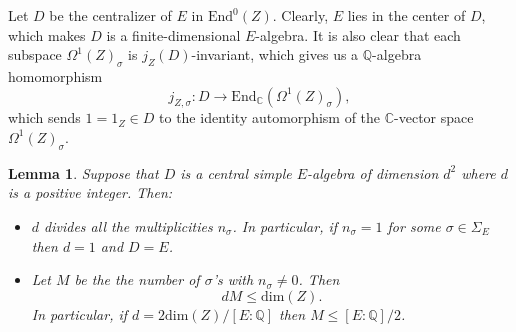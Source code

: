 \documentclass[12pt,a4paper,reqno]{amsart}
\def\Q{{\mathbb Q}}
\def\C{{\mathbb C}}
\def\End{\mathrm{End}}
\def\dim{\mathrm{dim}}
\newtheorem{lem}[thm]{Lemma}
\theoremstyle{definition}
\begin{document}
Let $D$ be the centralizer of $E$ in $\End^0(Z)$.  Clearly, $E$ lies in the center of $D$, which makes $D$ is a finite-dimensional $E$-algebra.
It is also clear that each subspace  $\Omega^1(Z)_{\sigma}$ is $j_Z(D)$-invariant, which gives us a $\Q$-algebra homomorphism
\begin{equation}
\label{difSigma}
j_{Z,\sigma}:D\to \End_{\C}(\Omega^1(Z)_{\sigma}),
\end{equation}
which sends $1=1_Z\in D$ to the identity automorphism of the $\C$-vector space 
$\Omega^1(Z)_{\sigma}$.

 

\begin{lem}
\label{divOmega1}
Suppose that $D$ is a central simple $E$-algebra of dimension $d^2$ where $d$ is a positive integer. Then: 

\begin{itemize}
\item[(i)]
$d$ divides
all the multiplicities $n_{\sigma}$.
In particular, if $n_{\sigma}=1$ for some $\sigma \in \Sigma_E$ then $d=1$ and $D=E$.
\item[(ii)]
Let $M$ be the the number of $\sigma$'s with $n_{\sigma}\ne 0$.
Then 
$$dM \le  \dim(Z).$$
In particular, if $d=2\dim(Z)/[E:\Q]$ then $M\le [E:\Q]/2$. 
\end{itemize}
\end{lem}
\end{document}
